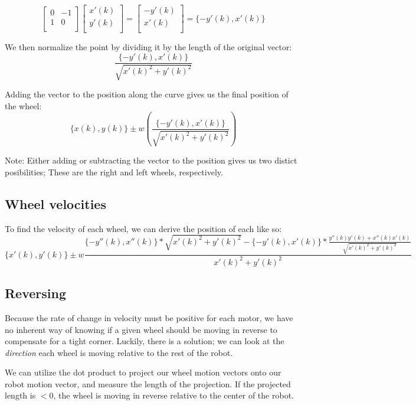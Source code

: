 \documentclass[12pt, english]{article}
\begin{document}
\[
	\begin{bmatrix}
		0 & -1 \\
		1 & 0 \\
	\end{bmatrix}
	\begin{bmatrix}
		x'(k)\\
		y'(k)\\
	\end{bmatrix}
	=
	\begin{bmatrix}
		-y'(k)\\
		x'(k)\\
	\end{bmatrix}
	= \{-y'(k), x'(k)\}
\]

\noindent
We then normalize the point by dividing it by the length of the original vector: \\
\[
	\label{deriv_speed_vec}
	\frac{\{-y'(k), x'(k)\}}{\sqrt{x'(k)^2+y'(k)^2}}
\]

\noindent
Adding the vector to the position along the curve gives us the final position of the wheel:
\[
	\{x(k), y(k)\} \pm w \left(\frac{\{-y'(k), x'(k)\}}{\sqrt{x'(k)^2+y'(k)^2}}\right)
\]

\noindent
Note: Either adding or subtracting  the vector to the position gives us two distict posibilities; These are the right and left wheels, respectively.

\subsection{Wheel velocities}
To find the velocity of each wheel, we can derive the position of each like so:
\[
	\{x'(k), y'(k)\} \pm w\frac{\{-y''(k), x''(k)\}*\sqrt{x'(k)^2+y'(k)^2} - \{-y'(k), x'(k)\} * \frac{y''(k)y'(k) + x''(k)x'(k)}{\sqrt{x'(k)^2+y'(k)^2}}}{x'(k)^2+y'(k)^2}
\]


\subsection{Reversing}
Because the rate of change in velocity must be positive for each motor, we have no inherent way of knowing if a given wheel should be moving in reverse to compensate for a tight corner. Luckily, there is a solution; we can look at the \textit{direction} each wheel is moving relative to the rest of the robot.
\par
We can utilize the dot product to project our wheel motion vectors onto our robot motion vector, and measure the length of the projection. If the projected length is $ < 0 $, the wheel is moving in reverse relative to the center of the robot.
\end{document}
